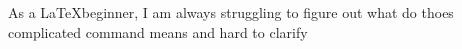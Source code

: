     As a \LaTeX beginner, I am always struggling  to figure out what do thoes complicated command means and hard to clarify 